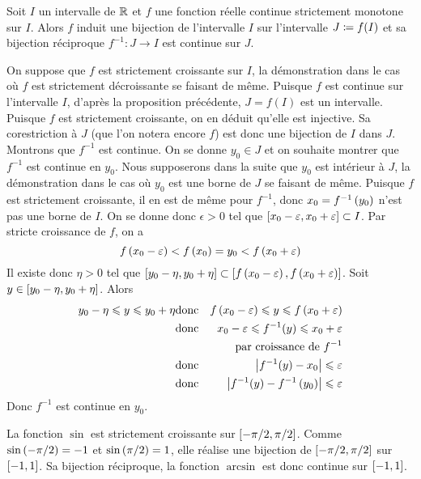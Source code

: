 \documentclass{magnolia}
\begin{document}
\begin{proposition}[utile=-3]
Soit $I$ un intervalle de $\mathbb{R}$ et $f$ une fonction réelle continue strictement
monotone sur $I$. Alors $f$ induit une bijection de l'intervalle $I$ sur
l'intervalle $J\coloneqq f(I)$ et sa bijection réciproque $f^{-1}:J\to I$ est
continue sur $J$.
\end{proposition}

\begin{preuve}
On suppose que $f$ est strictement croissante sur $I$, la démonstration dans le
cas où $f$ est strictement décroissante se faisant de même. Puisque $f$ est
continue sur l'intervalle $I$, d'après la proposition précédente, $J=f(I)$
est un intervalle. Puisque $f$ est strictement croissante, on en déduit
qu'elle est injective. Sa corestriction à $J$ (que l'on notera encore $f$)
est donc une bijection de $I$ dans $J$.\\
Montrons que $f^{-1}$ est continue. On se donne $y_0\in J$ et on souhaite
montrer que $f^{-1}$ est continue en $y_0$. Nous supposerons dans la suite que
$y_0$ est intérieur à $J$, la démonstration dans le cas où $y_0$ est une borne
de $J$ se faisant de même. Puisque $f$ est strictement croissante, il en est
de même pour $f^{-1}$, donc $x_0=f^{-1}\left(y_0\right)$ n'est pas une borne de $I$. On
se donne donc $\epsilon>0$ tel que
$\left[x_0-\varepsilon,x_0+\varepsilon\right]\subset I$. Par stricte croissance de $f$,
on a
\[f\left(x_0-\varepsilon\right)<f\left(x_0\right)=y_0<f\left(x_0+\varepsilon\right)\]
Il existe donc $\eta>0$ tel que $\left[y_0-\eta,y_0+\eta\right]\subset
\left[f\left(x_0-\varepsilon\right),f\left(x_0+\varepsilon\right)\right]$. Soit
$y\in\left[y_0-\eta,y_0+\eta\right]$. Alors
\begin{eqnarray*}
y_0-\eta\leqslant y\leqslant y_0+\eta
&\text{donc}& f\left(x_0-\varepsilon\right)\leqslant y\leqslant f\left(x_0+\varepsilon\right)\\
&\text{donc}& x_0-\varepsilon \leqslant f^{-1}(y) \leqslant x_0+\varepsilon\\
&     & \text{par croissance de $f^{-1}$}\\
&\text{donc}& \left|f^{-1}(y)-x_0\right|\leqslant\varepsilon\\
&\text{donc}& \left|f^{-1}(y)-f^{-1}\left(y_0\right)\right|\leqslant\varepsilon
\end{eqnarray*}
Donc $f^{-1}$ est continue en $y_0$.
\end{preuve}

\begin{remarqueUnique}
\remarque La fonction $\sin$ est strictement croissante sur $\left[-\pi/2,\pi/2\right]$.
  Comme $\sin\left(-\pi/2\right)=-1$ et $\sin\left(\pi/2\right)=1$, elle réalise une bijection
  de $\left[-\pi/2,\pi/2\right]$ sur $\left[-1,1\right]$. Sa bijection réciproque,
  la fonction $\arcsin$ est donc continue sur $\left[-1,1\right]$.
\end{remarqueUnique}
\end{document}
